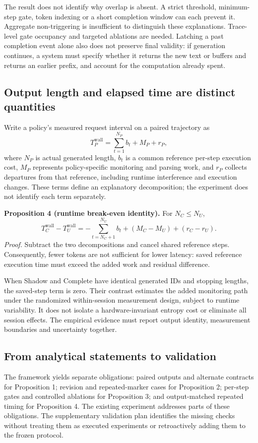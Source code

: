 \documentclass[12pt,a4paper]{article}
\begin{document}
The result does not identify why overlap is absent. A strict threshold, minimum-step gate, token indexing or a short completion window can each prevent it. Aggregate non-triggering is insufficient to distinguish these explanations. Trace-level gate occupancy and targeted ablations are needed. Latching a past completion event alone also does not preserve final validity: if generation continues, a system must specify whether it returns the new text or buffers and returns an earlier prefix, and account for the computation already spent.

\subsection{Output length and elapsed time are distinct quantities}
Write a policy's measured request interval on a paired trajectory as
\begin{equation}
 T^{\mathrm{wall}}_P=\sum_{t=1}^{N_P}b_t+M_P+r_P,
\end{equation}
where $N_P$ is actual generated length, $b_t$ is a common reference per-step execution cost, $M_P$ represents policy-specific monitoring and parsing work, and $r_P$ collects departures from that reference, including runtime interference and execution changes. These terms define an explanatory decomposition; the experiment does not identify each term separately.

\textbf{Proposition 4 (runtime break-even identity).} For $N_C\leq N_U$,
\begin{equation}\label{eq:break-even}
 T^{\mathrm{wall}}_C-T^{\mathrm{wall}}_U
 =-\sum_{t=N_C+1}^{N_U}b_t+(M_C-M_U)+(r_C-r_U).
\end{equation}
\emph{Proof.} Subtract the two decompositions and cancel shared reference steps. Consequently, fewer tokens are not sufficient for lower latency: saved reference execution time must exceed the added work and residual difference.

When Shadow and Complete have identical generated IDs and stopping lengths, the saved-step term is zero. Their contrast estimates the added monitoring path under the randomized within-session measurement design, subject to runtime variability. It does not isolate a hardware-invariant entropy cost or eliminate all session effects. The empirical evidence must report output identity, measurement boundaries and uncertainty together.

\subsection{From analytical statements to validation}
The framework yields separate obligations: paired outputs and alternate contracts for Proposition 1; revision and repeated-marker cases for Proposition 2; per-step gates and controlled ablations for Proposition 3; and output-matched repeated timing for Proposition 4. The existing experiment addresses parts of these obligations. The supplementary validation plan identifies the missing checks without treating them as executed experiments or retroactively adding them to the frozen protocol.
\end{document}
